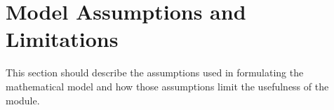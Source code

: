 

\section{Model Assumptions and Limitations}
This section should describe the assumptions used in formulating the mathematical model and how those assumptions limit the usefulness of the module.